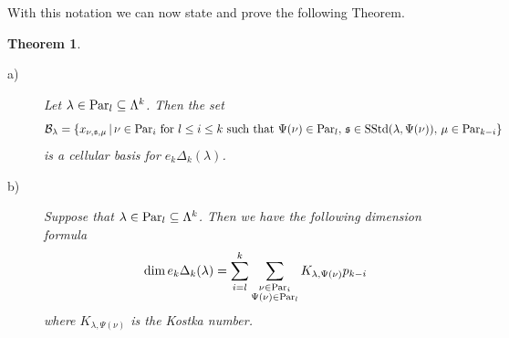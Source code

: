 \documentclass[10pt,hidelinks]{article}
\newcommand{\Par}{{\rm Par}   }
\newcommand{\s}{\mathfrak{s}}
\newcommand{\sstd}{{\rm SStd}}
\newtheorem{theorem}{Theorem}
\numberwithin{equation}{section}
\begin{document}
\medskip
With this notation we can now state and prove the following Theorem. 
\begin{theorem}\label{stateandproveA}
  \begin{description}
  \item[a)] 
    Let $ \lambda \in \Par_l \subseteq \Lambda^k $. Then the set 
    \begin{equation}\label{4.13}
      {\cal B}_{\lambda} = \{ x_{\nu, \s, \mu} \, | \, \nu \in \Par_i  \mbox{ for }   l \le i \le k \mbox{ such that } \Psi(\nu) \in \Par_l, \, 
\s \in \sstd(\lambda, \Psi(\nu)), \, \mu \in \Par_{k-i} \}
    \end{equation}
    is a cellular basis for $ e_k \Delta_k(\lambda) $. 
\item[b)] Suppose that $ \lambda \in \Par_l \subseteq \Lambda^k$. Then we have the
  following dimension formula
  \begin{equation}\label{48}
    \dim e_k \Delta_k(\lambda) =
    \sum_{i=l}^k \sum_{\substack{  \nu \in \Par_i  \\  \Psi(\nu) \in \Par_l }} K_{\lambda,  \Psi(\nu)} p_{{k-i}}
      \end{equation}    
where $ K_{\lambda,  \Psi(\nu)} $ is the Kostka number. 
  \end{description}
\end{theorem}
\end{document}
